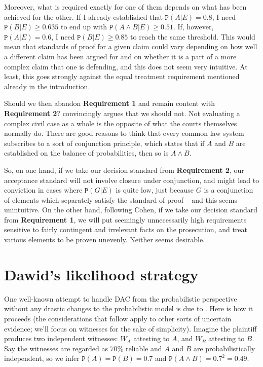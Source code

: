 \documentclass{ifcolog}
\newcommand{\pr}[1]{\mbox{$\mathtt{P}(#1)$}}
\newcommand{\et}{\wedge}
\begin{document}
Moreover, what is required exactly for one of them depends on what has been achieved for the other. If I already established that $\pr{A\vert E}=0.8$, I need $\pr{B\vert E}\geq 0.635$ to end up with $\pr{A\et B\vert E}\geq 0.51$. If, however, $\pr{A\vert E}=0.6$, I need $\pr{B\vert E}\geq 0.85$ to reach the same threshold. This would mean that standards of proof for a given claim could vary depending on how well a different claim has been argued for and on whether it is a part of a more complex claim that one is defending, and this does not seem very intuitive. At least, this goes strongly against the equal treatment requirement mentioned already in the introduction. 


Should we then abandon \textbf{Requirement 1} and remain content with \textbf{Requirement 2}? \citet[66]{Cohen1977The-probable-an} convincingly argues that we should not. Not evaluating  a complex civil case  as a whole is the opposite of what the courts themselves normally do. There are good reasons to think that every common law system subscribes to a sort of conjunction principle, which states that if $A$ and $B$ are established on the balance of probabilities, then  so is $A\et B$. 

So, on one hand, if we take our decision standard from \textbf{Requirement 2}, our acceptance standard will not  involve closure under conjunction, and might lead to conviction in cases where $\pr{G\vert E}$ is quite low, just because $G$ is a conjunction of elements which separately satisfy the standard of proof -- and this  seems unintuitive.  On the other hand, following Cohen,  if we take our decision standard from \textbf{Requirement 1}, we will put seemingly unnecessarily high requirements sensitive to fairly contingent and irrelevant facts on the prosecution, and treat various elements to be proven unevenly. Neither seems desirable. 


\section{Dawid's likelihood strategy}\label{sec:Dawid}


One well-known attempt to handle DAC from the probabilistic perspective without any drastic changes to the probabilistic model  is due to \citet{dawid1987difficulty}. Here is how it proceeds (the considerations that follow apply to other sorts of uncertain evidence; we'll focus on witnesses for the sake of simplicity). Imagine the plaintiff produces two independent witnesses: $W_A$ attesting to $A$, and $W_B$ attesting to $B$.  Say the witnesses are regarded as $70\%$ reliable and $A$ and $B$ are probabilistically independent, so we infer $\pr{A}=\pr{B}=0.7$ and  $\pr{A\et B}=0.7^2=0.49$. 
\end{document}
